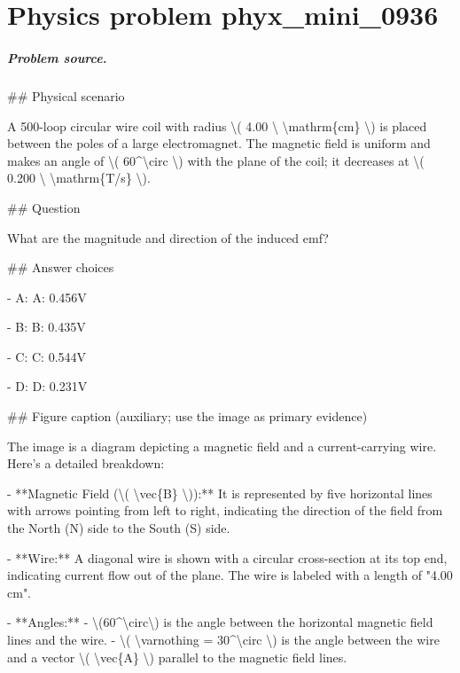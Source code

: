 
\chapter{Physics problem phyx\_mini\_0936}
\label{ch:PhyXMiniProblems_problem_phyx_mini_0936}

\paragraph{Problem source.}
\#\# Physical scenario

A 500-loop circular wire coil with radius \textbackslash{}( 4.00 \textbackslash{} \textbackslash{}mathrm\{cm\} \textbackslash{}) is placed between the poles of a large electromagnet. The magnetic field is uniform and makes an angle of \textbackslash{}( 60\textasciicircum{}\textbackslash{}circ \textbackslash{}) with the plane of the coil; it decreases at \textbackslash{}( 0.200 \textbackslash{} \textbackslash{}mathrm\{T/s\} \textbackslash{}).

\#\# Question

What are the magnitude and direction of the induced emf?

\#\# Answer choices

- A: A: 0.456V

- B: B: 0.435V

- C: C: 0.544V

- D: D: 0.231V

\#\# Figure caption (auxiliary; use the image as primary evidence)

The image is a diagram depicting a magnetic field and a current-carrying wire. Here’s a detailed breakdown:

- **Magnetic Field (\textbackslash{}( \textbackslash{}vec\{B\} \textbackslash{})):** It is represented by five horizontal lines with arrows pointing from left to right, indicating the direction of the field from the North (N) side to the South (S) side.

- **Wire:** A diagonal wire is shown with a circular cross-section at its top end, indicating current flow out of the plane. The wire is labeled with a length of "4.00 cm".

- **Angles:** 
  - \textbackslash{}(60\textasciicircum{}\textbackslash{}circ\textbackslash{}) is the angle between the horizontal magnetic field lines and the wire.
  - \textbackslash{}( \textbackslash{}varnothing = 30\textasciicircum{}\textbackslash{}circ \textbackslash{}) is the angle between the wire and a vector \textbackslash{}( \textbackslash{}vec\{A\} \textbackslash{}) parallel to the magnetic field lines.

